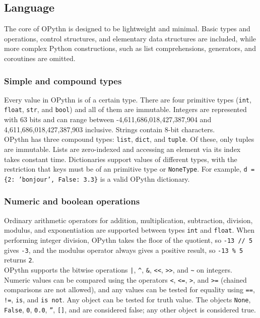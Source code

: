 \documentclass[11pt, twoside]{article}
\newcommand{\ms}{\texttt}
\begin{document}
    \subsection{Language}
    The core of OPythn is designed to be lightweight and minimal. Basic types and operations, control structures, and elementary data structures are included, while more complex Python constructions, such as list comprehensions, generators, and coroutines are omitted.
    \subsubsection{Simple and compound types}
    Every value in OPythn is of a certain type. There are four primitive types (\ms{int}, \ms{float}, \ms{str}, and \ms{bool}) and all of them are immutable. Integers are represented with 63 bits and can range between -4,611,686,018,427,387,904 and 4,611,686,018,427,387,903 inclusive. Strings contain 8-bit characters.\\
    \indent OPythn has three compound types: \ms{list}, \ms{dict}, and \ms{tuple}. Of these, only tuples are immutable. Lists are zero-indexed and accessing an element via its index takes constant time. Dictionaries support values of different types, with the restriction that keys must be of an primitive type or \ms{NoneType}. For example, \ms{d = \{2: 'bonjour', False: 3.3\}} is a valid OPythn dictionary.
   
    \subsubsection{Numeric and boolean operations}
    Ordinary arithmetic operators for addition, multiplication, subtraction, division, modulus, and exponentiation are supported between types \ms{int} and \ms{float}. When performing integer division, OPythn takes the floor of the quotient, so \ms{-13 // 5} gives \ms{-3}, and the modulus operator always gives a positive result, so \ms{-13 \% 5} returns \ms{2}.\\
    \indent OPythn supports the bitwise operations \ms{|}, \ms{\^}, \ms{\&}, \ms{<<}, \ms{>>}, and \ms{\~} on integers. Numeric values can be compared using the operators \ms{<}, \ms{<=}, \ms{>}, and \ms{>=} (chained comparisons are not allowed), and any values can be tested for equality using \ms{==}, \ms{!=}, \ms{is}, and \ms{is not}. Any object can be tested for truth value. The objects \ms{None}, \ms{False}, \ms{0}, \ms{0.0}, \ms{''}, \ms{[]}, and \ms{\string{\string}} are considered false; any other object is considered true.
\end{document}
